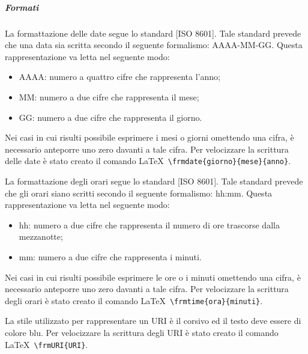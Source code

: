 \documentclass[../NormeProgetto.tex]{subfiles}
\begin{document}
		\subparagraph{Formati}
			La formattazione delle date segue lo standard [ISO 8601]. Tale standard prevede che una data sia scritta secondo il seguente formalismo: AAAA-MM-GG. Questa rappresentazione va letta nel seguente modo:
			\begin{itemize}
				\item AAAA: numero a quattro cifre che rappresenta l'anno;
				\item MM: numero a due cifre che rappresenta il mese;
				\item GG: numero a due cifre che rappresenta il giorno.
			\end{itemize}
			Nei casi in cui risulti possibile esprimere i mesi o giorni omettendo una cifra, è necessario anteporre uno zero davanti a tale cifra. Per velocizzare la scrittura delle date è stato creato il comando \LaTeX\ \texttt{\textbackslash frmdate\{giorno\}\{mese\}\{anno\}}.
			
			La formattazione degli orari segue lo standard [ISO 8601]. Tale standard prevede che gli orari siano scritti secondo il seguente formalismo: hh:mm. Questa rappresentazione va letta nel seguente modo:
			\begin{itemize}
				\item hh: numero a due cifre che rappresenta il numero di ore trascorse dalla mezzanotte;
				\item mm: numero a due cifre che rappresenta i minuti. 
			\end{itemize}						
			Nei casi in cui risulti possibile esprimere le ore o i minuti omettendo una cifra, è necessario anteporre uno zero davanti a tale cifra. Per velocizzare la scrittura degli orari è stato creato il comando \LaTeX\ \texttt{\textbackslash frmtime\{ora\}\{minuti\}}.
			
			La stile utilizzato per rappresentare un URI è il corsivo ed il testo deve essere di colore blu. Per velocizzare la scrittura degli URI è stato creato il comando \LaTeX\ \texttt{\textbackslash frmURI\{URI\}}.
			 
\end{document}
